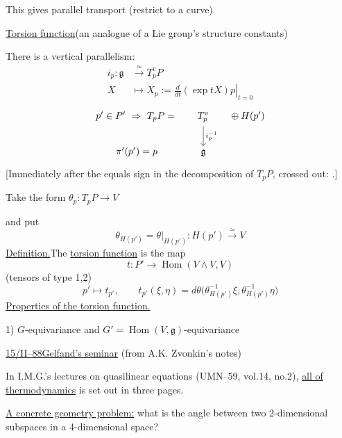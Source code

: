 This gives parallel transport (restrict to a curve)

\underline{Torsion function}\qquad (an analogue of a Lie group's structure constants)

There is a vertical parallelism:
\begin{equation*}
\begin{aligned}
i_p\colon\mathfrak g&\overset{\simeq}{\longrightarrow}T_p^vP\\
X&\mapsto X_p:=\left.\frac{d}{dt}(\exp tX)p\right|_{t=0}
\end{aligned}
\end{equation*}
\begin{equation*}
\begin{tikzcd}[column sep=small]
p'\in P'\ \Rightarrow\ T_pP={} & T_p^v \arrow[d,"i_p^{-1}"] & {}\oplus H(p') \\
\pi'(p')=p & \mathfrak g &
\end{tikzcd}
\end{equation*}
[Immediately after the equals sign in the decomposition of $T_pP$, crossed out:
.]

Take the form $\theta_p\colon T_pP\to V$

and put
\begin{equation*}
\theta_{H(p')}=\theta|_{H(p')}\colon H(p')\overset{\simeq}{\longrightarrow}V
\end{equation*}
\underline{Definition.}\quad The \underline{torsion function} is the map
\begin{equation*}
t\colon P'\longrightarrow\operatorname{Hom}(V\wedge V,V)
\end{equation*}
(tensors of type 1,2)
\begin{equation*}
p'\mapsto t_{p'},\qquad
 t_{p'}(\xi,\eta)=d\theta\bigl(\theta_{H(p')}^{-1}\xi,\theta_{H(p')}^{-1}\eta\bigr)
\end{equation*}
\underline{Properties of the torsion function.}

1) $G$-equivariance and $G'=\operatorname{Hom}(V,\mathfrak g)$-equivariance

\underline{15/II--88}\qquad \underline{Gelfand's seminar}
(from A.K. Zvonkin's notes)

In I.M.G.'s lectures on quasilinear equations (UMN--59, vol.14, no.2),
\underline{all of thermodynamics} is set out in three pages.

\underline{A concrete geometry problem:} what is the angle between two 2-dimensional subspaces
in a 4-dimensional space?

